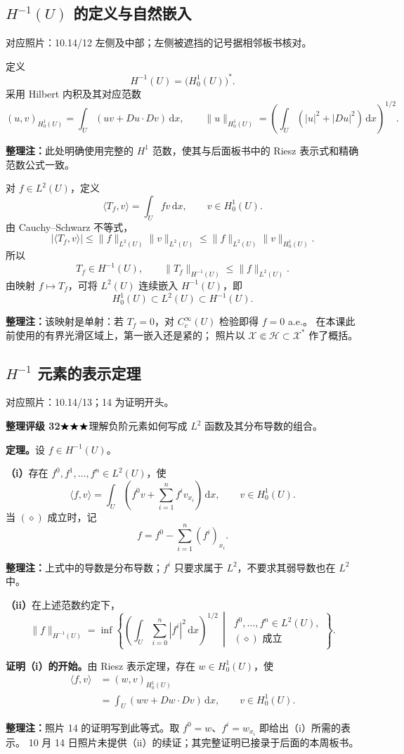 \documentclass[UTF8,a4paper,11pt,fontset=fandol]{ctexart}
\newcommand{\dd}{\,\mathrm d}
\newcommand{\ednote}[1]{\par{\small\color{notegray}\textbf{整理注：}#1}\par}
\newcommand{\source}[1]{{\small\color{notegray}对应照片：#1。}\par}
\newcommand{\proofstars}[1]{\ensuremath{%
\ifnum#1>0\relax\bigstar\fi
\ifnum#1>1\relax\bigstar\fi
\ifnum#1>2\relax\bigstar\fi
\ifnum#1>3\relax\bigstar\fi
\ifnum#1>4\relax\bigstar\fi}}
\newcommand{\proofrating}[3]{\par{\small\color{proofblue}%
\textbf{整理评级 #1}\enspace\proofstars{#2}\quad #3\par}}
\begin{document}
\subsection{\texorpdfstring{$H^{-1}(U)$ 的定义与自然嵌入}{负一阶空间的定义与自然嵌入}}
\source{10.14/12 左侧及中部；左侧被遮挡的记号据相邻板书核对}
定义
\[
H^{-1}(U)=\bigl(H_0^1(U)\bigr)^*.
\]
采用 Hilbert 内积及其对应范数
\[
(u,v)_{H_0^1(U)}=\int_U(uv+Du\cdot Dv)\dd x,\qquad
\|u\|_{H_0^1(U)}=\left(\int_U(|u|^2+|Du|^2)\dd x\right)^{1/2}.
\]
\ednote{此处明确使用完整的 $H^1$ 范数，使其与后面板书中的 Riesz 表示式和精确范数公式一致。}
对 $f\in L^2(U)$，定义
\[
\langle T_f,v\rangle=\int_Ufv\dd x,\qquad v\in H_0^1(U).
\]
由 Cauchy--Schwarz 不等式，
\[
|\langle T_f,v\rangle|
\leq\|f\|_{L^2(U)}\|v\|_{L^2(U)}
\leq\|f\|_{L^2(U)}\|v\|_{H_0^1(U)}.
\]
所以
\[
T_f\in H^{-1}(U),\qquad
\|T_f\|_{H^{-1}(U)}\leq\|f\|_{L^2(U)}.
\]
由映射 $f\mapsto T_f$，可将 $L^2(U)$ 连续嵌入 $H^{-1}(U)$，即
\[
H_0^1(U)\subset L^2(U)\subset H^{-1}(U).
\]
\ednote{该映射是单射：若 $T_f=0$，对 $C_c^\infty(U)$ 检验即得 $f=0$ a.e.。
在本课此前使用的有界光滑区域上，第一嵌入还是紧的；
照片以 $\mathcal X\Subset\mathcal H\subset\mathcal X^*$ 作了概括。}

\newpage
\subsection{\texorpdfstring{$H^{-1}$ 元素的表示定理}{负一阶空间元素的表示定理}}
\source{10.14/13；14 为证明开头}
\proofrating{32}{3}{理解负阶元素如何写成 $L^2$ 函数及其分布导数的组合。}
\textbf{定理。}设 $f\in H^{-1}(U)$。

\textbf{（i）}存在 $f^0,f^1,\ldots,f^n\in L^2(U)$，使
\[
\boxed{\langle f,v\rangle
=\int_U\left(f^0v+\sum_{i=1}^nf^iv_{x_i}\right)\dd x,
\qquad v\in H_0^1(U).}
\tag{$\diamond$}
\]
当 $(\diamond)$ 成立时，记
\[
f=f^0-\sum_{i=1}^n(f^i)_{x_i}.
\]
\ednote{上式中的导数是分布导数；$f^i$ 只要求属于 $L^2$，不要求其弱导数也在 $L^2$ 中。}

\textbf{（ii）}在上述范数约定下，
\[
\boxed{\|f\|_{H^{-1}(U)}
=\inf\left\{\left(\int_U\sum_{i=0}^n|f^i|^2\dd x\right)^{1/2}
\,\middle|\,
\begin{gathered}
f^0,\ldots,f^n\in L^2(U),\\
\text{$(\diamond)$ 成立}
\end{gathered}\right\}.}
\]

\textbf{证明（i）的开始。}由 Riesz 表示定理，存在 $w\in H_0^1(U)$，使
\[
\begin{aligned}
\langle f,v\rangle
&=(w,v)_{H_0^1(U)}\\
&=\int_U(wv+Dw\cdot Dv)\dd x,
\qquad v\in H_0^1(U).
\end{aligned}
\]
\ednote{照片 14 的证明写到此等式。取 $f^0=w$、$f^i=w_{x_i}$ 即给出（i）所需的表示。
10 月 14 日照片未提供（ii）的续证；其完整证明已接录于后面的本周板书。}
\end{document}
